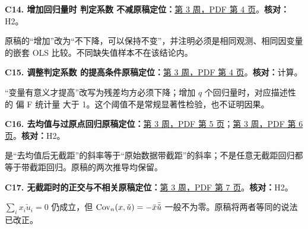 \par\medskip\noindent\begin{minipage}{\linewidth}

\label{err:r2-monotonic}

\textbf{C14. 增加回归量时 判定系数 不减}\quad\textbf{原稿定位：}\hyperref[src:w3p4]{第 3 周，PDF 第 4 页}。\quad\textbf{核对：}H2。\par

原稿的“增加”改为“不下降，可以保持不变”，并注明必须是相同观测、相同因变量的嵌套 OLS 比较。不同缺失值样本不在该结论内。

\end{minipage}\par

\par\medskip\noindent\begin{minipage}{\linewidth}

\label{err:adjusted-meaning}

\textbf{C15. 调整判定系数 的提高条件}\quad\textbf{原稿定位：}\hyperref[src:w3p4]{第 3 周，PDF 第 4 页}。\quad\textbf{核对：}计算。\par

“变量有意义才提高”改写为残差均方必须下降；增加 $q$ 个回归量时，对应描述性的 偏 F 统计量 大于 1。这个阈值不是常规显著性检验，也不证明因果。

\end{minipage}\par

\par\medskip\noindent\begin{minipage}{\linewidth}

\label{err:demeaning}

\textbf{C16. 去均值与过原点回归}\quad\textbf{原稿定位：}\hyperref[src:w3p5]{第 3 周，PDF 第 5 页}；\hyperref[src:w3p6]{第 3 周，PDF 第 6 页}。\quad\textbf{核对：}H2。\par

是“去均值后无截距”的斜率等于“原始数据带截距”的斜率；不是任意无截距回归都等于带截距回归。原稿的两次推导均保留。

\end{minipage}\par

\par\medskip\noindent\begin{minipage}{\linewidth}

\label{err:rto-covariance}

\textbf{C17. 无截距时的正交与不相关}\quad\textbf{原稿定位：}\hyperref[src:w3p7]{第 3 周，PDF 第 7 页}。\quad\textbf{核对：}H2。\par

$\sum_i x_i\check u_i=0$ 仍成立，但 $\operatorname{Cov}_n(x,\check u)=-\bar x\bar{\check u}$ 一般不为零。原稿将两者等同的说法已改正。

\end{minipage}\par

